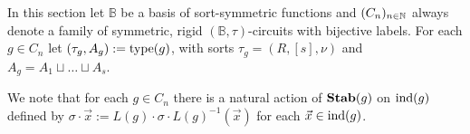 \documentclass[../paper.tex]{subfiles}
\begin{document}
In this section let $\mathbb{B}$ be a basis of sort-symmetric functions and
$(C_n)_{n \in \mathbb{N}}$ always denote a family of symmetric, rigid $(\mathbb{B},
\tau)$-circuits with bijective labels. For each $g \in C_n$ let $(\tau_g, A_g)
:= \text{type}(g)$, with sorts $\tau_g = (R, [s], \nu)$ and $A_g = A_1 \sqcup \ldots
\sqcup A_s$.

We note that for each $g \in C_n$ there is a natural action of $\text{\textbf{Stab}}(g)$ on
$\text{\upshape ind}(g)$ defined by $\sigma \cdot \vec{x} := L(g) \cdot \sigma \cdot L(g)^{-1}
(\vec{x})$ for each $\vec{x} \in \text{\upshape ind}(g)$.
%





\end{document}
